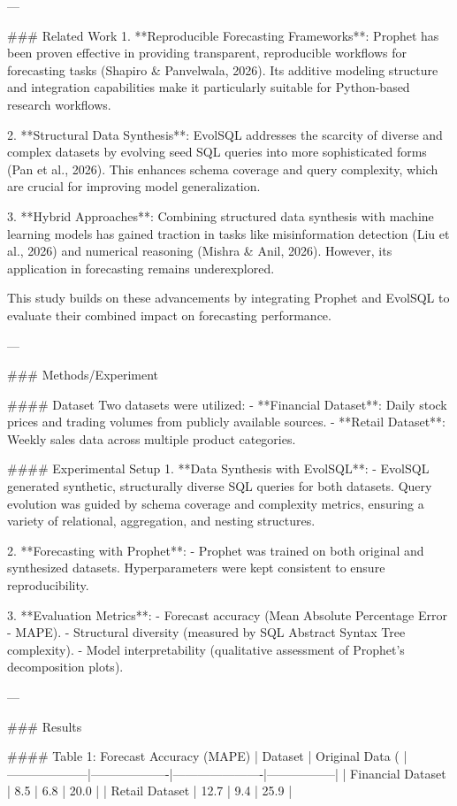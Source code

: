 ---

### Related Work
1. **Reproducible Forecasting Frameworks**: Prophet has been proven effective in providing transparent, reproducible workflows for forecasting tasks (Shapiro & Panvelwala, 2026). Its additive modeling structure and integration capabilities make it particularly suitable for Python-based research workflows.

2. **Structural Data Synthesis**: EvolSQL addresses the scarcity of diverse and complex datasets by evolving seed SQL queries into more sophisticated forms (Pan et al., 2026). This enhances schema coverage and query complexity, which are crucial for improving model generalization.

3. **Hybrid Approaches**: Combining structured data synthesis with machine learning models has gained traction in tasks like misinformation detection (Liu et al., 2026) and numerical reasoning (Mishra & Anil, 2026). However, its application in forecasting remains underexplored.

This study builds on these advancements by integrating Prophet and EvolSQL to evaluate their combined impact on forecasting performance.

---

### Methods/Experiment

#### Dataset
Two datasets were utilized:
- **Financial Dataset**: Daily stock prices and trading volumes from publicly available sources.
- **Retail Dataset**: Weekly sales data across multiple product categories.

#### Experimental Setup
1. **Data Synthesis with EvolSQL**:
   - EvolSQL generated synthetic, structurally diverse SQL queries for both datasets. Query evolution was guided by schema coverage and complexity metrics, ensuring a variety of relational, aggregation, and nesting structures.

2. **Forecasting with Prophet**:
   - Prophet was trained on both original and synthesized datasets. Hyperparameters were kept consistent to ensure reproducibility.

3. **Evaluation Metrics**:
   - Forecast accuracy (Mean Absolute Percentage Error - MAPE).
   - Structural diversity (measured by SQL Abstract Syntax Tree complexity).
   - Model interpretability (qualitative assessment of Prophet’s decomposition plots).

---

### Results

#### Table 1: Forecast Accuracy (MAPE)
| Dataset            | Original Data (%
|--------------------|-------------------|----------------------|-----------------|
| Financial Dataset  | 8.5               | 6.8                  | 20.0           |
| Retail Dataset     | 12.7              | 9.4                  | 25.9           |

